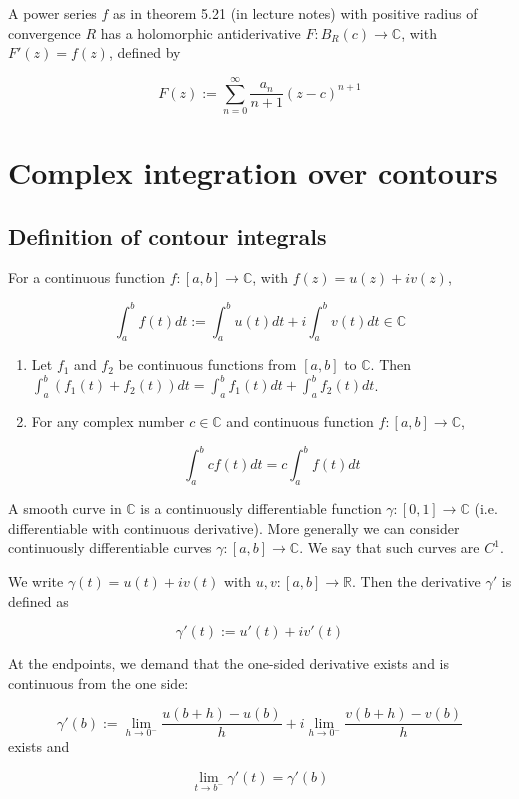 \begin{corollary}
	A power series $f$ as in theorem 5.21 (in lecture notes) with positive radius of convergence $R$ has a holomorphic antiderivative $F: B_R(c) \rightarrow \mathbb{C}$, with $F'(z) = f(z)$, defined by

	\[F(z) := \sum_{n = 0}^{\infty} \frac{a_n}{n + 1} {(z - c)}^{n + 1}\]
\end{corollary}

\hfill

\section{Complex integration over contours}

\subsection{Definition of contour integrals}

\begin{definition}
	For a continuous function $f: [a, b] \rightarrow \mathbb{C}$, with $f(z) = u(z) + i v(z)$,

	\[\int_a^b f(t) dt := \int_a^b u(t) dt + i \int_a^b v(t) dt \in \mathbb{C}\]
\end{definition}

\begin{lemma}
	\hfill
	\begin{enumerate}
		\item Let $f_1$ and $f_2$ be continuous functions from $[a, b]$ to $\mathbb{C}$. Then $\int_a^b (f_1(t) + f_2(t)) dt = \int_a^b f_1(t) dt + \int_a^b f_2(t) dt$.
		\item For any complex number $c \in \mathbb{C}$ and continuous function $f: [a, b] \rightarrow \mathbb{C}$,
		
		\[ \int_a^b c f(t) dt = c \int_a^b f(t) dt \]
	\end{enumerate}
\end{lemma}

\begin{definition}
	A smooth curve in $\mathbb{C}$ is a continuously differentiable function $\gamma: [0, 1] \rightarrow \mathbb{C}$ (i.e. differentiable with continuous derivative). More generally we can consider continuously differentiable curves $\gamma: [a, b] \rightarrow \mathbb{C}$. We say that such curves are $C^1$.

\end{definition}

\begin{remark}
	We write $\gamma(t) = u(t) + i v(t)$ with $u, v: [a, b] \rightarrow \mathbb{R}$. Then the derivative $\gamma'$ is defined as

	\[ \gamma'(t) := u'(t) + i v'(t) \]

	At the endpoints, we demand that the one-sided derivative exists and is continuous from the one side:

	\[ \gamma'(b) := \lim_{h \rightarrow 0^-} \frac{u(b + h) - u(b)}{h} + i \lim_{h \rightarrow 0^-} \frac{v(b + h) - v(b)}{h} \] exists and

	\[ \lim_{t \rightarrow b^-} \gamma'(t) = \gamma'(b) \]
\end{remark}

